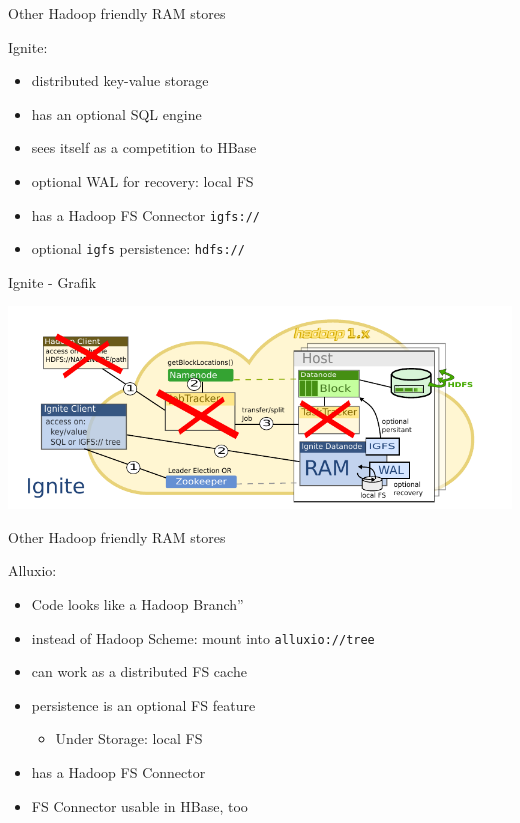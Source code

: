 \begin{frame}[fragile]{Other Hadoop friendly RAM stores}
\protect\hypertarget{other-hadoop-friendly-ram-stores-2}{}

Ignite:

\begin{itemize}
\tightlist
\item
  distributed key-value storage
\item
  has an optional SQL engine
\item
  sees itself as a competition to HBase
\item
  optional WAL for recovery: local FS
\item
  has a Hadoop FS Connector \texttt{igfs://}
\item
  optional \texttt{igfs} persistence: \texttt{hdfs://}
\end{itemize}

\end{frame}

\begin{frame}{Ignite - Grafik}
\protect\hypertarget{ignite---grafik}{}

\includegraphics{fig/ignite.pdf}

\end{frame}

\begin{frame}[fragile]{Other Hadoop friendly RAM stores}
\protect\hypertarget{other-hadoop-friendly-ram-stores-3}{}

Alluxio:

\begin{itemize}
\tightlist
\item
  Code looks like a Hadoop \glqq{}Branch''
\item
  instead of Hadoop Scheme: mount into \texttt{alluxio://tree}
\item
  can work as a distributed FS cache
\item
  persistence is an optional FS feature

  \begin{itemize}
  \tightlist
  \item
    Under Storage: local FS
  \end{itemize}
\item
  has a Hadoop FS Connector
\item
  FS Connector usable in HBase, too
\end{itemize}

\end{frame}

